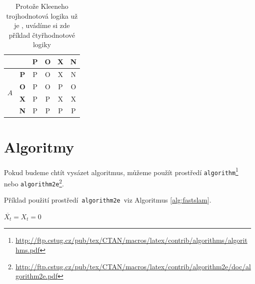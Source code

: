 \documentclass[11pt, a4paper]{article}
\begin{document}
\begin{table}[ht]
\begin{center}
\begin{tabular}{|c|c|c|c|c|c|}
            \multicolumn{2}{|c|}{} & \textbf{P} & \textbf{O} & \textbf{X} & \textbf{N} \\ \hline
            \multirow{4}{*}{\textbf{$A$}} & \textbf{P} & P & O & X & N \\ \cline{2-6}
            & \textbf{O} & P & O & P & O \\ \cline{2-6}
            & \textbf{X} & P & P & X & X \\ \cline{2-6}
            & \textbf{N} & P & P & P & P \\ \hline
        \end{tabular}
    \caption{Protože Kleeneho trojhodnotová logika už je , uvádíme si zde příklad čtyřhodnotové logiky\label{tab:logika}}
\end{center}
\end{table}
\pagebreak

\section{Algoritmy\label{sec:algoritmy}}
Pokud budeme chtít vysázet algoritmus, můžeme použít prostředí 
\texttt{algorithm}\footnote{\href{http://ftp.cstug.cz/pub/tex/CTAN/macros/latex/contrib/algorithms/algorithms.pdf}{http://ftp.cstug.cz/pub/tex/CTAN/macros/latex/contrib/algorithms/algorithms.pdf}}
nebo \texttt{algorithm2e}\footnote{\href{http://ftp.cstug.cz/pub/tex/CTAN/macros/latex/contrib/algorithm2e/doc/algorithm2e.pdf}{http://ftp.cstug.cz/pub/tex/CTAN/macros/latex/contrib/algorithm2e/doc/algorithm2e.pdf}}.\par
\noindent Příklad použití prostředí\texttt{ algorithm2e }viz Algoritmus \ref{alg:fastslam}.\\\bigskip

\IncMargin{1.5em}
\begin{algorithm}[H]\label{alg:fastslam}
\SetAlgoLined
\SetAlgoNoLine
{}
\DontPrintSemicolon
\SetNlSty{}{}{:}
\Indm\Indmm
{}
\Indp\Indpp
$\overline{X_t} = X_t = 0$\;
\;
\caption{\textsc{FastSLAM}}
\end{algorithm}
\vspace{1.1em} 
\end{document}
